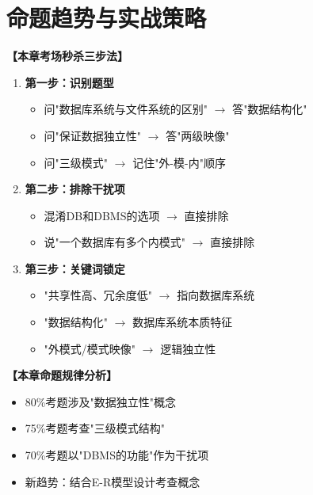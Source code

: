 \documentclass[12pt, a4paper]{article}
\newenvironment{bluebox}[1]{%
  \begin{trivlist}
  \item[\hskip\labelsep \textbf{#1}]
  \setlength{\parskip}{0.5ex}
  \setlength{\itemsep}{0.5ex}
}{%
  \end{trivlist}
}
\begin{document}
\section{命题趋势与实战策略}

\begin{bluebox}{考场秒杀三步法}
	\textbf{【本章考场秒杀三步法】}

	\begin{enumerate}
		\item \textbf{第一步：识别题型}
		      \begin{itemize}
			      \item 问"数据库系统与文件系统的区别" $\rightarrow$ 答"数据结构化"
			      \item 问"保证数据独立性" $\rightarrow$ 答"两级映像"
			      \item 问"三级模式" $\rightarrow$ 记住"外-模-内"顺序
		      \end{itemize}

		\item \textbf{第二步：排除干扰项}
		      \begin{itemize}
			      \item 混淆DB和DBMS的选项 $\rightarrow$ 直接排除
			      \item 说"一个数据库有多个内模式" $\rightarrow$ 直接排除
		      \end{itemize}

		\item \textbf{第三步：关键词锁定}
		      \begin{itemize}
			      \item "共享性高、冗余度低" $\rightarrow$ 指向数据库系统
			      \item "数据结构化" $\rightarrow$ 数据库系统本质特征
			      \item "外模式/模式映像" $\rightarrow$ 逻辑独立性
		      \end{itemize}
	\end{enumerate}
\end{bluebox}

\begin{bluebox}{近年真题规律}
	\textbf{【本章命题规律分析】}

	\begin{itemize}
		\item 80\%考题涉及"数据独立性"概念
		\item 75\%考题考查"三级模式结构"
		\item 70\%考题以"DBMS的功能"作为干扰项
		\item 新趋势：结合E-R模型设计考查概念
	\end{itemize}
\end{bluebox}
\end{document}
